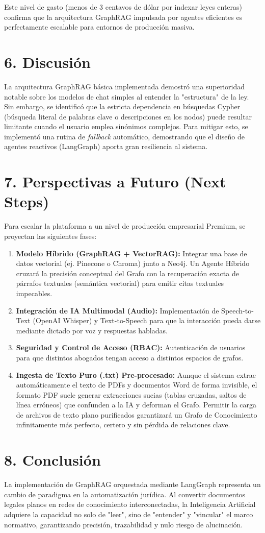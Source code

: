 \documentclass[12pt,a4paper]{article}
\begin{document}
Este nivel de gasto (menos de 3 centavos de dólar por indexar leyes enteras) confirma que la arquitectura GraphRAG impulsada por agentes eficientes es perfectamente escalable para entornos de producción masiva.

\section*{6. Discusión}
La arquitectura GraphRAG básica implementada demostró una superioridad notable sobre los modelos de chat simples al entender la "estructura" de la ley. Sin embargo, se identificó que la estricta dependencia en búsquedas Cypher (búsqueda literal de palabras clave o descripciones en los nodos) puede resultar limitante cuando el usuario emplea sinónimos complejos. Para mitigar esto, se implementó una rutina de \textit{fallback} automático, demostrando que el diseño de agentes reactivos (LangGraph) aporta gran resiliencia al sistema.

\section*{7. Perspectivas a Futuro (Next Steps)}
Para escalar la plataforma a un nivel de producción empresarial Premium, se proyectan las siguientes fases:
\begin{enumerate}
    \item \textbf{Modelo Híbrido (GraphRAG + VectorRAG):} Integrar una base de datos vectorial (ej. Pinecone o Chroma) junto a Neo4j. Un Agente Híbrido cruzará la precisión conceptual del Grafo con la recuperación exacta de párrafos textuales (semántica vectorial) para emitir citas textuales impecables.
    \item \textbf{Integración de IA Multimodal (Audio):} Implementación de Speech-to-Text (OpenAI Whisper) y Text-to-Speech para que la interacción pueda darse mediante dictado por voz y respuestas habladas.
    \item \textbf{Seguridad y Control de Acceso (RBAC):} Autenticación de usuarios para que distintos abogados tengan acceso a distintos espacios de grafos.
    \item \textbf{Ingesta de Texto Puro (.txt) Pre-procesado:} Aunque el sistema extrae automáticamente el texto de PDFs y documentos Word de forma invisible, el formato PDF suele generar extracciones sucias (tablas cruzadas, saltos de línea erróneos) que confunden a la IA y deforman el Grafo. Permitir la carga de archivos de texto plano purificados garantizará un Grafo de Conocimiento infinitamente más perfecto, certero y sin pérdida de relaciones clave.
\end{enumerate}

\section*{8. Conclusión}
La implementación de GraphRAG orquestada mediante LangGraph representa un cambio de paradigma en la automatización jurídica. Al convertir documentos legales planos en redes de conocimiento interconectadas, la Inteligencia Artificial adquiere la capacidad no solo de "leer", sino de "entender" y "vincular" el marco normativo, garantizando precisión, trazabilidad y nulo riesgo de alucinación.
\end{document}
